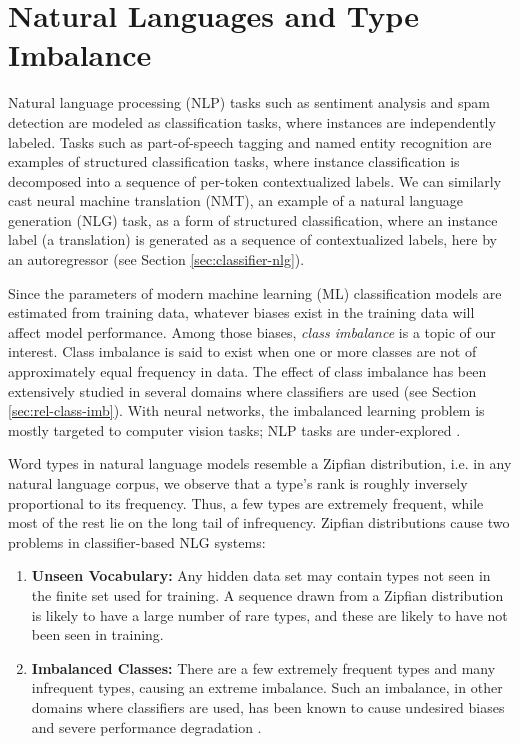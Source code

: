 \chapter{Natural Languages and Type Imbalance}
\label{ch:nlg-imbalance}

Natural language processing (NLP) tasks such as sentiment analysis \cite{maas-etal-2011-imdbreview, Zhang-etal-15-cnn-sentiment} and spam detection are modeled as classification tasks, where instances are independently labeled.
Tasks such as part-of-speech tagging \cite{CoNLL2017-shared-UD} and named entity recognition \cite{CoNLL-2003-NER} are examples of structured classification tasks, where instance classification is decomposed into a sequence of per-token contextualized labels.
We can similarly cast neural machine translation (NMT), an example of a natural language generation (NLG) task, as a form of structured classification, where an instance label (a translation) is generated as a sequence of contextualized labels, here by an autoregressor (see Section \ref{sec:classifier-nlg}).

Since the parameters of modern machine learning (ML) classification models are estimated from training data, whatever biases exist in the training data will affect model performance.
Among those biases, \textit{class imbalance} is a topic of our interest. 
Class imbalance is said to exist when one or more classes are not of approximately equal frequency in data.
The effect of class imbalance has been extensively studied in several domains where classifiers are used (see Section \ref{sec:rel-class-imb}).
With neural networks, the imbalanced learning problem is mostly targeted to computer vision tasks; NLP tasks are under-explored \cite{Johnson2019SurveyImbalance}. %
 
Word types in natural language models resemble a Zipfian distribution, i.e. in any natural language corpus, we observe that a type's rank is roughly inversely proportional to its frequency. Thus, a few types are extremely frequent, while most of the rest lie on the long tail of infrequency. 
Zipfian distributions cause two problems in classifier-based NLG systems:
\begin{enumerate}
    \itemsep0em 
    \item \textbf{Unseen Vocabulary:} 
    Any hidden data set may contain types not seen in the finite set used for training. A sequence drawn from a Zipfian distribution is likely to have a large number of rare types, and these are likely to have not been seen in training.
    \item \textbf{Imbalanced Classes:} There are a few extremely frequent types and many infrequent types, causing an extreme imbalance.  
    Such an imbalance, in other domains where classifiers are used, has been known to cause undesired biases and severe performance degradation \cite{Johnson2019SurveyImbalance}. 
\end{enumerate} 

